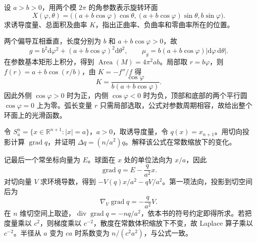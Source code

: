 \begin{exercise}\label{g3:ex:torus-revolution}
	设 \(a>b>0\)，用两个模 \(2\pi\) 的角参数表示旋转环面
	\[
		X(\varphi,\theta)=\bigl((a+b\cos\varphi)\cos\theta,
		(a+b\cos\varphi)\sin\theta,b\sin\varphi\bigr).
	\]
	求诱导度量、总面积及曲率 \(K\)，指出正曲率、负曲率和零曲率所在的位置。
\end{exercise}
\begin{solution}
	两个偏导互相垂直，长度分别为 \(b\) 和 \(a+b\cos\varphi>0\)，故
	\[
		g=b^2\mathrm d\varphi^2+(a+b\cos\varphi)^2\mathrm d\theta^2,\qquad
		\mu_g=b(a+b\cos\varphi)|\mathrm d\varphi\,\mathrm d\theta|.
	\]
	在参数基本矩形上积分，得到 \(\operatorname{Area}(M)=4\pi^2ab\)。局部取 \(r=b\varphi\)，则 \(f(r)=a+b\cos(r/b)\)，由 \(K=-f''/f\) 得
	\[
		K=\frac{\cos\varphi}{b(a+b\cos\varphi)}.
	\]
	因此外侧 \(\cos\varphi>0\) 时为正，内侧 \(\cos\varphi<0\) 时为负，顶部和底部的两个平行圆 \(\cos\varphi=0\) 上为零。弧长变量 \(r\) 只需局部选取，公式对参数周期相容，故给出整个环面上的光滑函数。
\end{solution}

\begin{exercise}\label{g3:ex:round-sphere-height}
	令 \(S_a^n=\{x\in\mathbb R^{n+1}:|x|=a\}\)，\(a>0\)，取诱导度量，令 \(q(x)=x_{n+1}\)。用切向投影计算 \(\operatorname{grad}q\)，并证明 \(\Delta q=(n/a^2)q\)。解释该公式在常数缩放下的变化。
\end{exercise}
\begin{solution}
	记最后一个常坐标向量为 \(E\)。球面在 \(x\) 处的单位法向为 \(x/a\)，因此
	\[
		\operatorname{grad}q=E-\frac{q}{a^2}x.
	\]
	对切向量 \(V\) 求环境导数，得到 \(-V(q)x/a^2-qV/a^2\)。第一项法向，投影到切空间后为
	\[
		\nabla_V\operatorname{grad}q=-\frac{q}{a^2}V.
	\]
	在 \(n\) 维切空间上取迹，\(\operatorname{div}\operatorname{grad}q=-nq/a^2\)，依本书的符号约定即得所求。若把度量乘以 \(c^2\)，则梯度乘以 \(c^{-2}\)，散度在常数体积缩放下不变，故 Laplace 算子乘以 \(c^{-2}\)。半径从 \(a\) 变为 \(ca\) 时系数变为 \(n/(c^2a^2)\)，与公式一致。
\end{solution}
